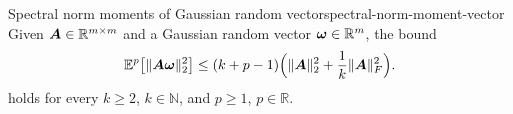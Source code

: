 \begin{lemma}{Spectral norm moments of Gaussian random vector}{spectral-norm-moment-vector}
    Given $\boldsymbol{A} \in \mathbb{R}^{m \times m}$ and a Gaussian random vector $\boldsymbol{\omega} \in \mathbb{R}^{m}$, the bound
    \[
        \mathbb{E}^{p}\big[ \lVert \boldsymbol{A} \boldsymbol{\omega} \rVert _2^2 \big]
        \leq  (k + p - 1) \Big( \lVert \boldsymbol{A} \rVert _2^2 + \frac{1}{k} \lVert \boldsymbol{A} \rVert _F^2 \Big).
    \]
    holds for every $k \ge 2$, $k\in \mathbb{N}$, and $p \ge 1$, $p\in \mathbb R$.
\end{lemma}%
